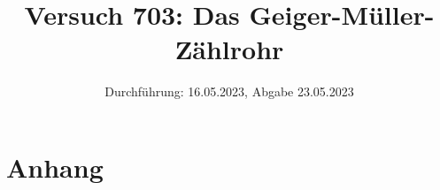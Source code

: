 

\title{Versuch 703: Das Geiger-Müller-Zählrohr}
\date{Durchführung: 16.05.2023, Abgabe 23.05.2023}


\maketitle
\thispagestyle{empty} 
\tableofcontents
\newpage
\setcounter{page}{1}






\printbibliography
\newpage

\section*{Anhang}


